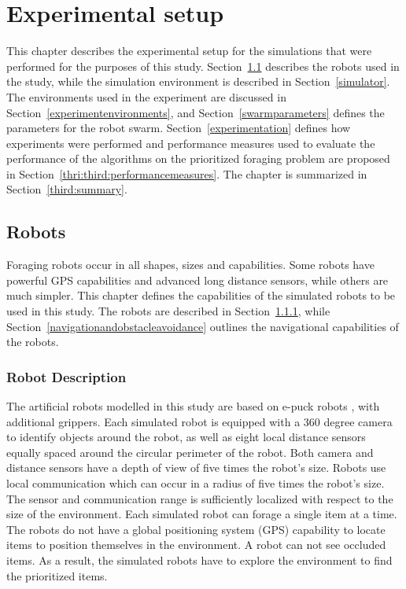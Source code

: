 
\chapter{Experimental setup}
\label{chap:experiment}


This chapter describes the experimental setup for the simulations that were performed for the purposes of this study. Section~\ref{chap:robots} describes the robots used in the study, while the simulation environment is described in Section~\ref{simulator}. The environments used in the experiment are discussed in Section~\ref{experimentenvironments}, and Section~\ref{swarmparameters} defines the parameters for the robot swarm. Section~\ref{experimentation} defines how experiments were performed and performance measures used to evaluate the performance of the algorithms on the prioritized foraging problem are proposed in Section~\ref{thri:third:performancemeasures}. The chapter is summarized in Section~\ref{third:summary}.


\section{Robots}
\label{chap:robots}

Foraging robots occur in all shapes, sizes and capabilities. Some robots have powerful GPS capabilities and advanced long distance sensors, while others are much simpler. This chapter defines the capabilities of the simulated robots to be used in this study. The robots are described in Section~\ref{robotdescription}, while Section~\ref{navigationandobstacleavoidance} outlines the navigational capabilities of the robots. 

\subsection{Robot Description}
\label{robotdescription}

The artificial robots modelled in this study are based on e-puck robots \cite{mondada2009puck}, with additional grippers. Each simulated robot is equipped with a 360 degree camera to identify objects around the robot, as well as eight local distance sensors equally spaced around the circular perimeter of the robot. Both camera and distance sensors have a depth of view of five times the robot's size. Robots use local communication which can occur in a radius of five times the robot's size. The sensor and communication range is sufficiently localized with respect to the size of the environment. Each simulated robot can forage a single item at a time. The robots do not have a global positioning system (GPS) capability to locate items to position themselves in the environment. A robot can not see occluded items. As a result, the simulated robots have to explore the environment to find the prioritized items.

